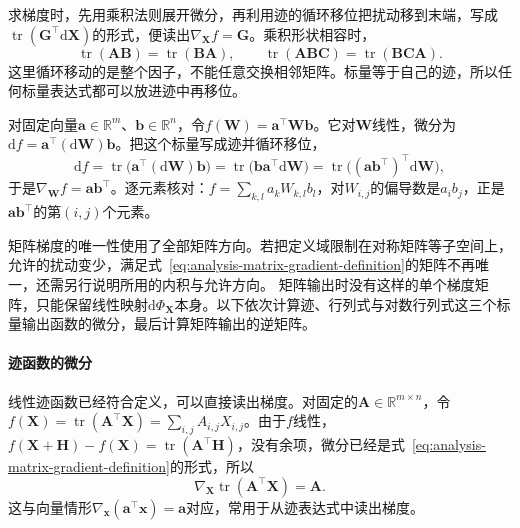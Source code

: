 求梯度时，先用乘积法则展开微分，再利用迹的循环移位把扰动移到末端，写成$\operatorname{tr}(\bm G^\top\mathrm d\bm X)$的形式，便读出$\nabla_{\bm X}f=\bm G$。乘积形状相容时，
\[
 \operatorname{tr}(\bm A\bm B)=\operatorname{tr}(\bm B\bm A),\qquad
 \operatorname{tr}(\bm A\bm B\bm C)=\operatorname{tr}(\bm B\bm C\bm A).
\]
这里循环移动的是整个因子，不能任意交换相邻矩阵。标量等于自己的迹，所以任何标量表达式都可以放进迹中再移位。
\begin{example}[双线性函数的矩阵梯度]
\label{ex:multivariable-bilinear-matrix-gradient}
对固定向量$\bm a\in\mathbb R^m$、$\bm b\in\mathbb R^n$，令$f(\bm W)=\bm a^\top\bm W\bm b$。它对$\bm W$线性，微分为$\mathrm df=\bm a^\top(\mathrm d\bm W)\bm b$。把这个标量写成迹并循环移位，
\[
 \mathrm df=\operatorname{tr}\bigl(\bm a^\top(\mathrm d\bm W)\bm b\bigr)=\operatorname{tr}\bigl(\bm b\bm a^\top\mathrm d\bm W\bigr)
 =\operatorname{tr}\bigl((\bm a\bm b^\top)^\top\mathrm d\bm W\bigr),
\]
于是$\nabla_{\bm W}f=\bm a\bm b^\top$。逐元素核对：$f=\sum_{k,l}a_kW_{k,l}b_l$，对$W_{i,j}$的偏导数是$a_ib_j$，正是$\bm a\bm b^\top$的第$(i,j)$个元素。
\end{example}

矩阵梯度的唯一性使用了全部矩阵方向。若把定义域限制在对称矩阵等子空间上，允许的扰动变少，满足式~\eqref{eq:analysis-matrix-gradient-definition}的矩阵不再唯一，还需另行说明所用的内积与允许方向。
矩阵输出时没有这样的单个梯度矩阵，只能保留线性映射$\mathrm d\Phi_{\bm X}$本身。以下依次计算迹、行列式与对数行列式这三个标量输出函数的微分，最后计算矩阵输出的逆矩阵。

\paragraph{迹函数的微分}
线性迹函数已经符合定义，可以直接读出梯度。对固定的$\bm{A}\in\mathbb{R}^{m\times n}$，令$f(\bm{X})=\operatorname{tr}(\bm{A}^{\top}\bm{X})=\sum_{i,j}A_{i,j}X_{i,j}$。由于$f$线性，$f(\bm X+\bm H)-f(\bm X)=\operatorname{tr}(\bm A^\top\bm H)$，没有余项，微分已经是式~\eqref{eq:analysis-matrix-gradient-definition}的形式，所以
\begin{equation}
  \nabla_{\bm{X}}\operatorname{tr}(\bm{A}^{\top}\bm{X})
  =\bm{A}.
\label{eq:analysis-trace-linear-gradient}
\end{equation}
这与向量情形$\nabla_{\bm x}(\bm a^\top\bm x)=\bm a$对应，常用于从迹表达式中读出梯度。

